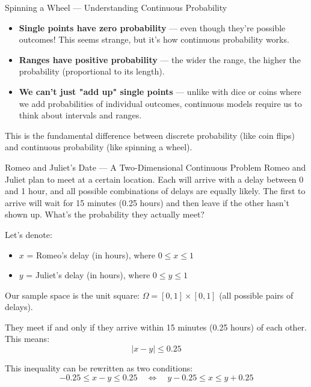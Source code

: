 \begin{itemize}
\begin{exampleboxbreak}{Spinning a Wheel — Understanding Continuous Probability}
\begin{itemize}
  \item \textbf{Single points have zero probability} — even though they're possible outcomes! This seems strange, but it's how continuous probability works.

  \item \textbf{Ranges have positive probability} — the wider the range, the higher the probability (proportional to its length).

  \item \textbf{We can't just "add up" single points} — unlike with dice or coins where we add probabilities of individual outcomes, continuous models require us to think about intervals and ranges.
\end{itemize}

This is the fundamental difference between discrete probability (like coin flips) and continuous probability (like spinning a wheel).
\end{exampleboxbreak}

\begin{exampleboxbreak}{Romeo and Juliet's Date — A Two-Dimensional Continuous Problem}
Romeo and Juliet plan to meet at a certain location. Each will arrive with a delay between 0 and 1 hour, and all possible combinations of delays are equally likely. The first to arrive will wait for 15 minutes (0.25 hours) and then leave if the other hasn't shown up. What's the probability they actually meet?


Let's denote:
\begin{itemize}
    \item $x$ = Romeo's delay (in hours), where $0 \leq x \leq 1$
    \item $y$ = Juliet's delay (in hours), where $0 \leq y \leq 1$
\end{itemize}

Our sample space is the unit square: $\Omega = [0,1] \times [0,1]$ (all possible pairs of delays).


They meet if and only if they arrive within 15 minutes (0.25 hours) of each other. This means:
\[
|x - y| \leq 0.25
\]

This inequality can be rewritten as two conditions:
\[
-0.25 \leq x - y \leq 0.25 \quad \Longleftrightarrow \quad y - 0.25 \leq x \leq y + 0.25
\]



\end{exampleboxbreak}
\end{itemize}

